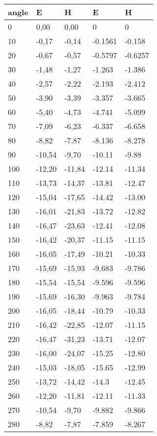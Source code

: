 \begin{table*}[!ht]
\begin{tabular}{|l|l|l|l|l|}
angle & E & H & E & H \\ \hline
0 & 0,00 & 0,00 & 0  & 0 \\ \hline
10 & -0,17 & -0,14 & -0.1561 & -0.158 \\ \hline
20 & -0,67 & -0,57 & -0.5797 & -0.6257 \\ \hline
30 & -1,48 & -1,27 & -1.263 & -1.386 \\ \hline
40 & -2,57 & -2,22 & -2.193 & -2.412 \\ \hline
50 & -3,90 & -3,39 & -3.357 & -3.665 \\ \hline
60 & -5,40 & -4,73 & -4.741 & -5.099 \\ \hline
70 & -7,09 & -6,23 & -6.337 & -6.658 \\ \hline
80 & -8,82 & -7,87 & -8.136 & -8.278 \\ \hline
90 & -10,54 & -9,70 & -10.11 & -9.88 \\ \hline
100 & -12,20 & -11,84 & -12.14 & -11.34 \\ \hline
110 & -13,73 & -14,37 & -13.81 & -12.47 \\ \hline
120 & -15,04 & -17,65 & -14.42 & -13.00 \\ \hline
130 & -16,01 & -21,83 & -13.72 & -12.82 \\ \hline
140 & -16,47 & -23,63 & -12.41 & -12.08 \\ \hline
150 & -16,42 & -20,37 & -11.15 & -11.15 \\ \hline
160 & -16,05 & -17,49 & -10.21 & -10.33 \\ \hline
170 & -15,69 & -15,93 & -9.683 & -9.786 \\ \hline
180 & -15,54 & -15,54 & -9.596 & -9.596 \\ \hline
190 & -15,69 & -16,30 & -9.963 & -9.784 \\ \hline
200 & -16,05 & -18,44 & -10.79 & -10.33 \\ \hline
210 & -16,42 & -22,85 & -12.07 & -11.15 \\ \hline
220 & -16,47 & -31,23 & -13.71 & -12.07 \\ \hline
230 & -16,00 & -24,07 & -15.25 & -12.80 \\ \hline
240 & -15,03 & -18,05 & -15.65 & -12.99 \\ \hline
250 & -13,72 & -14,42 & -14.3 & -12.45 \\ \hline
260 & -12,20 & -11,81 & -12.11 & -11.33 \\ \hline
270 & -10,54 & -9,70 & -9.882 & -9.866 \\ \hline
280 & -8,82 & -7,87 & -7.859 & -8.267 \\ \hline

\end{tabular}
\end{table*}
